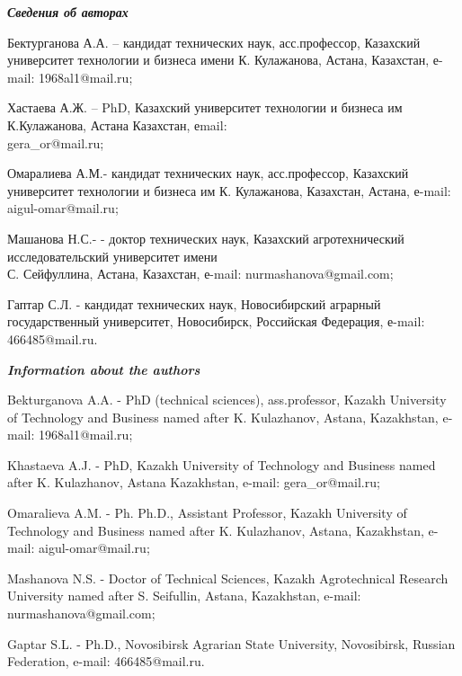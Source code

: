 \begin{authorinfo}
\emph{{\bfseries Сведения об авторах}}

Бектурганова А.А. -- кандидат технических наук, асс.профессор, Казахский
университет технологии и бизнеса имени К. Кулажанова, Астана, Казахстан,
е-mail: 1968al1@mail.ru;

Хастаева А.Ж. -- PhD, Казахский университет технологии и бизнеса им
К.Кулажанова, Астана Казахстан, еmail: \\gera\_or@mail.ru;

Омаралиева А.М.- кандидат технических наук, асс.профессор, Казахский
университет технологии и бизнеса им К. Кулажанова, Казахстан, Астана,
е-mail: aigul-omar@mail.ru;

Машанова Н.С.- - доктор технических наук, Казахский агротехнический
исследовательский университет имени \\С. Сейфуллина, Астана, Казахстан,
е-mail: nurmashanova@gmail.com;

Гаптар С.Л. - кандидат технических наук, Новосибирский аграрный
государственный университет, Новосибирск, Российская Федерация, е-mail:
466485@mail.ru.

\emph{{\bfseries Information about the authors}}

Bekturganova A.A. - PhD (technical sciences), ass.professor, Kazakh
University of Technology and Business named after K. Kulazhanov,
Astana, Kazakhstan, e-mail: 1968al1@mail.ru;

Khastaeva A.J. - PhD, Kazakh University of Technology and Business
named after K. Kulazhanov, Astana Kazakhstan, e-mail: gera\_or@mail.ru;

Omaralieva A.M. - Ph. Ph.D., Assistant Professor, Kazakh University of
Technology and Business named after K. Kulazhanov, Astana, Kazakhstan,
e-mail: aigul-omar@mail.ru;

Mashanova N.S. - Doctor of Technical Sciences, Kazakh Agrotechnical
Research University named after S. Seifullin, Astana, Kazakhstan,
e-mail: nurmashanova@gmail.com;

Gaptar S.L. - Ph.D., Novosibirsk Agrarian State University,
Novosibirsk, Russian Federation, e-mail: 466485@mail.ru.
\end{authorinfo}
